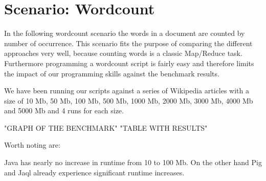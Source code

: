 \section{Scenario: Wordcount}

In the following wordcount scenario the words in a document are counted by number of occurrence. This scenario fits the purpose of comparing the different approaches very well, because counting words is a classic Map/Reduce task. Furthermore programming a wordcount script is fairly easy and therefore limits the impact of our programming skills against the benchmark results.

We have been running our scripts against a series of Wikipedia articles with a size of 10 Mb, 50 Mb, 100 Mb, 500 Mb, 1000 Mb, 2000 Mb, 3000 Mb, 4000 Mb and 5000 Mb and 4 runs for each size.

{"GRAPH OF THE BENCHMARK"}
{"TABLE WITH RESULTS"}

Worth noting are:

Java has nearly no increase in runtime from 10 to 100 Mb. On the other hand Pig and Jaql already experience significant runtime increases.